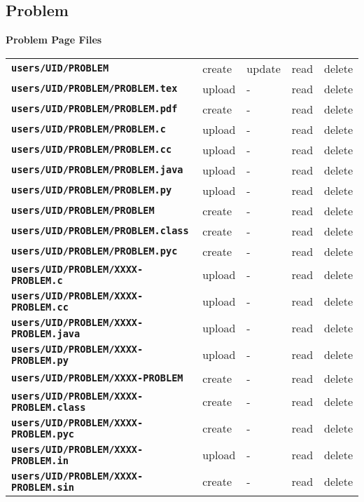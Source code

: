 \documentclass[12pt]{article}
\newcommand{\TT}[1]{{\tt \bfseries #1}}
\begin{document}
\subsection{Problem}

\begin{center}
{\bf Problem Page Files}
\\[1ex]
\begin{tabular}{lllll}
\TT{users/UID/PROBLEM}	                & create  & update & read & delete
\\[1ex]
\TT{users/UID/PROBLEM/PROBLEM.tex}	& upload  & -      & read & delete \\
\TT{users/UID/PROBLEM/PROBLEM.pdf}	& create  & -      & read & delete
\\[1ex]
\TT{users/UID/PROBLEM/PROBLEM.c}	& upload  & -      & read & delete \\
\TT{users/UID/PROBLEM/PROBLEM.cc}	& upload  & -      & read & delete \\
\TT{users/UID/PROBLEM/PROBLEM.java}	& upload  & -      & read & delete \\
\TT{users/UID/PROBLEM/PROBLEM.py}	& upload  & -      & read & delete \\
\TT{users/UID/PROBLEM/PROBLEM}		& create  & -      & read & delete \\
\TT{users/UID/PROBLEM/PROBLEM.class}	& create  & -      & read & delete \\
\TT{users/UID/PROBLEM/PROBLEM.pyc}	& create  & -      & read & delete
\\[1ex]
\TT{users/UID/PROBLEM/XXXX-PROBLEM.c}	& upload  & -      & read & delete \\
\TT{users/UID/PROBLEM/XXXX-PROBLEM.cc}	& upload  & -      & read & delete \\
\TT{users/UID/PROBLEM/XXXX-PROBLEM.java}& upload  & -      & read & delete \\
\TT{users/UID/PROBLEM/XXXX-PROBLEM.py}	& upload  & -      & read & delete \\
\TT{users/UID/PROBLEM/XXXX-PROBLEM}	& create  & -      & read & delete \\
\TT{users/UID/PROBLEM/XXXX-PROBLEM.class}
					& create  & -      & read & delete \\
\TT{users/UID/PROBLEM/XXXX-PROBLEM.pyc}	& create  & -      & read & delete
\\[1ex]
\TT{users/UID/PROBLEM/XXXX-PROBLEM.in}	& upload  & -      & read & delete \\
\TT{users/UID/PROBLEM/XXXX-PROBLEM.sin}	& create  & -      & read & delete \\

\end{tabular}
\end{center}
\end{document}
